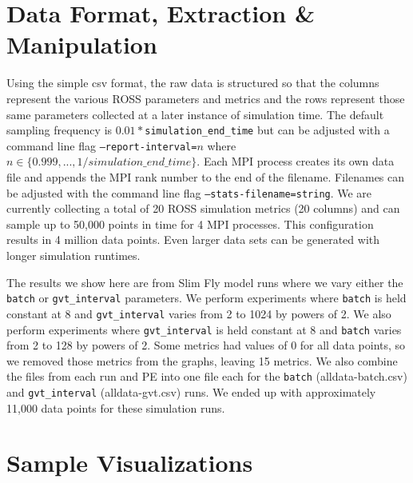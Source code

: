 \documentclass[12pt]{article}
\begin{document}
\section{Data Format, Extraction \& Manipulation} 

Using the simple csv format, the raw data is structured so that the columns represent the various ROSS parameters and metrics and the rows represent those same parameters collected at a later instance of simulation time. The default sampling frequency is $0.01*$\texttt{simulation\_end\_time} but can be adjusted with a command line flag \texttt{--report-interval=$n$} where $n\in \{0.999, ..., 1/simulation\_end\_time\}$. Each MPI process creates its own data file and appends the MPI rank number to the end of the filename. Filenames can be adjusted with the command line flag \texttt{--stats-filename=string}. We are currently collecting a total of 20 ROSS simulation metrics (20 columns) and can sample up to 50,000 points in time for 4 MPI processes. This configuration results in 4 million data points. Even larger data sets can be generated with longer simulation runtimes.

The results we show here are from Slim Fly model runs where we vary either the \texttt{batch} or \texttt{gvt\_interval} parameters.  We perform experiments where \texttt{batch} is held constant at 8 and \texttt{gvt\_interval} varies from 2 to 1024 by powers of 2.  We also perform experiments where \texttt{gvt\_interval} is held constant at 8 and \texttt{batch} varies from 2 to 128 by powers of 2.  Some metrics had values of 0 for all data points, so we removed those metrics from the graphs, leaving 15 metrics.  We also combine the files from each run and PE into one file each for the \texttt{batch} (alldata-batch.csv) and \texttt{gvt\_interval} (alldata-gvt.csv) runs.  We ended up with approximately 11,000 data points for these simulation runs.


\section{Sample Visualizations}
\end{document}
